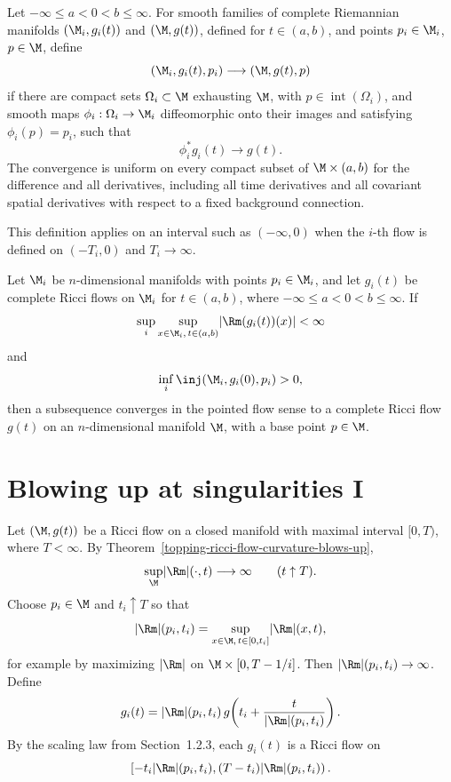 \begin{definition}
\label{topping-ch7-flow-convergence}
Let $-\infty\leq a<0<b\leq\infty$. For smooth families of complete
Riemannian manifolds $(\M_i,g_i(t))$ and $(\M,g(t))$, defined for
$t\in(a,b)$, and points $p_i\in\M_i$, $p\in\M$, define
\[
(\M_i,g_i(t),p_i)\longrightarrow(\M,g(t),p)
\]
if there are compact sets $\Omega_i\subset\M$ exhausting $\M$, with
$p\in\operatorname{int}(\Omega_i)$, and smooth maps
$\phi_i:\Omega_i\to\M_i$ diffeomorphic onto their images and satisfying
$\phi_i(p)=p_i$, such that
\[
\phi_i^*g_i(t)\longrightarrow g(t).
\]
The convergence is uniform on every compact subset of $\M\times(a,b)$ for
the difference and all derivatives, including all time derivatives and all
covariant spatial derivatives with respect to a fixed background connection.
\end{definition}

\begin{remark}
\label{topping-ch7-flow-backward-interval}
This definition applies on an interval such as $(-\infty,0)$ when the
$i$-th flow is defined on $(-T_i,0)$ and $T_i\to\infty$.
\end{remark}

\begin{theorem}
\label{topping-ch7-compactness-ricci-flows}
Let $\M_i$ be $n$-dimensional manifolds with points $p_i\in\M_i$, and let
$g_i(t)$ be complete Ricci flows on $\M_i$ for
$t\in(a,b)$, where $-\infty\leq a<0<b\leq\infty$. If
\[
\sup_i\sup_{x\in\M_i,\,t\in(a,b)}\lvert\Rm(g_i(t))(x)\rvert<\infty
\]
and
\[
\inf_i\inj(\M_i,g_i(0),p_i)>0,
\]
then a subsequence converges in the pointed flow sense to a complete Ricci
flow $g(t)$ on an $n$-dimensional manifold $\M$, with a base point $p\in\M$.
\end{theorem}

\section{Blowing up at singularities I}

Let $(\M,g(t))$ be a Ricci flow on a closed manifold with maximal interval
$[0,T)$, where $T<\infty$. By Theorem~\ref{topping-ricci-flow-curvature-blows-up},
\[
\sup_{\M}\lvert\Rm\rvert(\cdot,t)\longrightarrow\infty
\qquad (t\uparrow T).
\]
Choose $p_i\in\M$ and $t_i\uparrow T$ so that
\[
\lvert\Rm\rvert(p_i,t_i)
=\sup_{x\in\M,\,t\in[0,t_i]}\lvert\Rm\rvert(x,t),
\]
for example by maximizing $\lvert\Rm\rvert$ on
$\M\times[0,T-1/i]$. Then
$\lvert\Rm\rvert(p_i,t_i)\to\infty$. Define
\[
g_i(t)=\lvert\Rm\rvert(p_i,t_i)\,
g\!\left(t_i+\frac{t}{\lvert\Rm\rvert(p_i,t_i)}\right).
\]
By the scaling law from Section~1.2.3, each $g_i(t)$ is a Ricci flow on
\[
\left[-t_i\lvert\Rm\rvert(p_i,t_i),
(T-t_i)\lvert\Rm\rvert(p_i,t_i)\right).
\]

